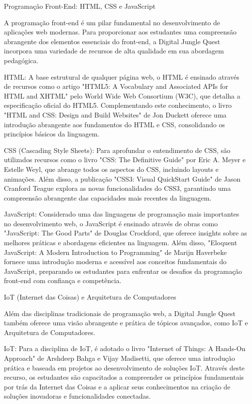 Programação Front-End: HTML, CSS e JavaScript

A programação front-end é um pilar fundamental no desenvolvimento de aplicações web modernas. Para proporcionar aos estudantes uma compreensão abrangente dos elementos essenciais do front-end, a Digital Jungle Quest incorpora uma variedade de recursos de alta qualidade em sua abordagem pedagógica.

HTML: A base estrutural de qualquer página web, o HTML é ensinado através de recursos como o artigo "HTML5: A Vocabulary and Associated APIs for HTML and XHTML" pelo World Wide Web Consortium (W3C), que detalha a especificação oficial do HTML5. Complementando este conhecimento, o livro "HTML and CSS: Design and Build Websites" de Jon Duckett oferece uma introdução abrangente aos fundamentos do HTML e CSS, consolidando os princípios básicos da linguagem.

CSS (Cascading Style Sheets): Para aprofundar o entendimento de CSS, são utilizados recursos como o livro "CSS: The Definitive Guide" por Eric A. Meyer e Estelle Weyl, que abrange todos os aspectos do CSS, incluindo layouts e animações. Além disso, a publicação "CSS3: Visual QuickStart Guide" de Jason Cranford Teague explora as novas funcionalidades do CSS3, garantindo uma compreensão abrangente das capacidades mais recentes da linguagem.

JavaScript: Considerado uma das linguagens de programação mais importantes no desenvolvimento web, o JavaScript é ensinado através de obras como "JavaScript: The Good Parts" de Douglas Crockford, que oferece insights sobre as melhores práticas e abordagens eficientes na linguagem. Além disso, "Eloquent JavaScript: A Modern Introduction to Programming" de Marijn Haverbeke fornece uma introdução moderna e acessível aos conceitos fundamentais do JavaScript, preparando os estudantes para enfrentar os desafios da programação front-end com confiança e competência.

IoT (Internet das Coisas) e Arquitetura de Computadores

Além das disciplinas tradicionais de programação web, a Digital Jungle Quest também oferece uma visão abrangente e prática de tópicos avançados, como IoT e Arquitetura de Computadores.

IoT: Para a disciplina de IoT, é adotado o livro "Internet of Things: A Hands-On Approach" de Arshdeep Bahga e Vijay Madisetti, que oferece uma introdução prática e baseada em projetos ao desenvolvimento de soluções IoT. Através deste recurso, os estudantes são capacitados a compreender os princípios fundamentais por trás da Internet das Coisas e a aplicar seus conhecimentos na criação de soluções inovadoras e funcionalidades conectadas.

